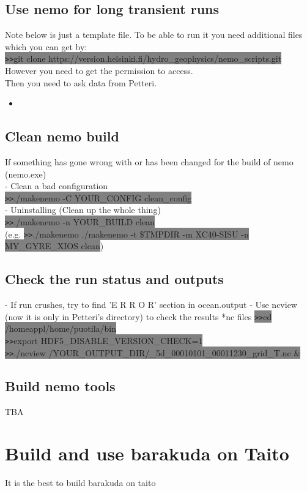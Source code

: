 \documentclass[11pt]{article}
\newcommand{\insertcode}[2]{\begin{itemize}\item[]\end{itemize}} %
\begin{document}
\subsection{Use nemo for long transient runs}
Note below is just a template file. To be able to run it you need additional files which you can get by: \\
\colorbox{Grey}{\texttt{>>}git clone https://version.helsinki.fi/hydro\_geophysics/nemo\_scripts.git} \\
However you need to get the permission to access. \\
Then you need to ask data from Petteri.\\
\insertcode{"../NEMO_sh_script/N101.sh"}{} 
\subsection{Clean nemo build}
If something has gone wrong with or has been changed for the build of nemo (nemo.exe)\\
-	Clean a bad configuration \\
\colorbox{Grey}{\texttt{>>}./makenemo -C YOUR\_CONFIG clean\_config}\\
-	Uninstalling (Clean up the whole thing)\\
\colorbox{Grey}{\texttt{>>}./makenemo -n YOUR\_BUILD clean}\\
(e.g. \colorbox{Grey}{\texttt{>>}./makenemo ./makenemo -t \$TMPDIR -m XC40-SISU -n MY\_GYRE\_XIOS clean})
\subsection{Check the run status and outputs}
- If run crushes, try to find 'E R R O R' section in ocean.output 
- Use ncview (now it is only in Petteri’s directory) to check the results *nc files
\colorbox{Grey}{\texttt{>>}cd /homeappl/home/puotila/bin}\\
\colorbox{Grey}{\texttt{>>}export HDF5\_DISABLE\_VERSION\_CHECK=1}\\
\colorbox{Grey}{\texttt{>>}./ncview /YOUR\_OUTPUT\_DIR/\*\_5d\_00010101\_00011230\_grid\_T.nc \&}\\
\subsection{Build nemo tools}
TBA
\section{Build and use barakuda on Taito}
It is the best to build barakuda on taito
\end{document}
